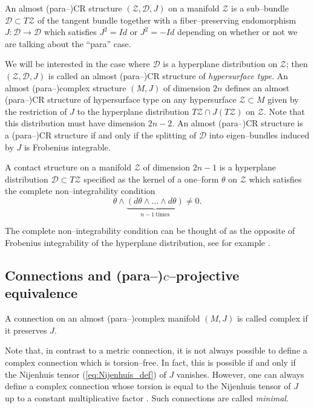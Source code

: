 \begin{defi}
An almost (para--)CR structure $(\mathcal{Z},\mathcal{D},J)$ on a manifold $\mathcal{Z}$ is a sub--bundle $\mathcal{D}\subset T\mathcal{Z}$ of the tangent bundle together with a fiber--preserving endomorphism $J:\mathcal{D}\rightarrow\mathcal{D}$ which satisfies $J^2=Id$ or $J^2=-Id$ depending on whether or not we are talking about the ``para'' case.
\end{defi}

We will be interested in the case where $\mathcal{D}$ is a hyperplane distribution on $\mathcal{Z}$; then $(\mathcal{Z},\mathcal{D},J)$ is called an almost (para--)CR structure of \textit{hypersurface type}. An almost (para--)complex structure $(M,J)$ of dimension $2n$ defines an almost (para--)CR structure of hypersurface type on any hypersurface $\mathcal{Z}\subset M$ given by the restriction of $J$ to the hyperplane distribution $T\mathcal{Z}\cap J(T\mathcal{Z})$ on $\mathcal{Z}$. Note that this distribution must have dimension $2n-2$. An almost (para--)CR structure is a (para--)CR structure if and only if the splitting of $\mathcal{D}$ into eigen--bundles induced by $J$ is Frobenius integrable.


\begin{defi}
A contact structure on a manifold $\mathcal{Z}$ of dimension $2n-1$ is a hyperplane distribution $\mathcal{D}\subset T\mathcal{Z}$ specified as the kernel of a one--form $\theta$ on $\mathcal{Z}$ which satisfies the complete non--integrability condition
\[
\theta\wedge \underbrace{(d\theta \wedge \dots\wedge d\theta)}_{n-1\ \mathrm{times}} \neq 0.
\]
\end{defi}

The complete non--integrability condition can be thought of as the opposite of Frobenius integrability of the hyperplane distribution, see for example \cite{arnold}.


\subsection{Connections and (para--)$c$--projective equivalence}

\begin{defi}
A connection on an almost (para--)complex manifold $(M,J)$ is called complex if it preserves $J$.
\end{defi}

Note that, in contrast to a metric connection, it is not always possible to define a complex connection which is torsion--free. In fact, this is possible if and only if the Nijenhuis tensor (\ref{eq:Nijenhuis_def}) of $J$ vanishes. However, one can always define a complex connection whose torsion is equal to the Nijenhuis tensor of $J$ up to a constant multiplicative factor \cite{c_proj}. Such connections are called \textit{minimal}.

